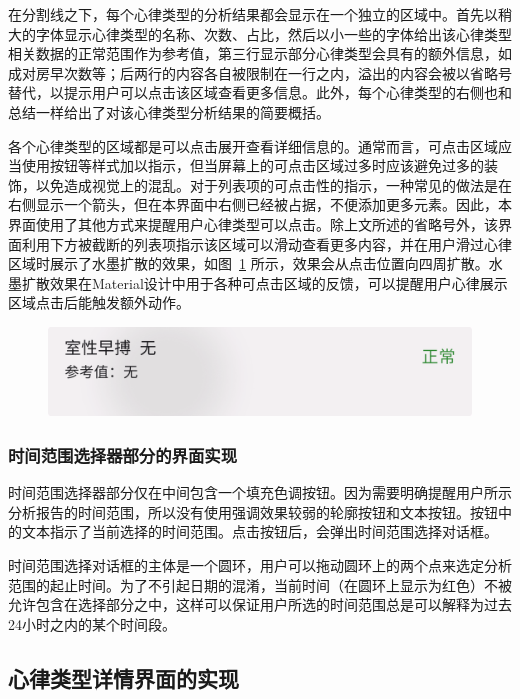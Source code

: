在分割线之下，每个心律类型的分析结果都会显示在一个独立的区域中。首先以稍大的字体显示心律类型的名称、次数、占比，然后以小一些的字体给出该心律类型相关数据的正常范围作为参考值，第三行显示部分心律类型会具有的额外信息，如成对房早次数等；后两行的内容各自被限制在一行之内，溢出的内容会被以省略号替代，以提示用户可以点击该区域查看更多信息。此外，每个心律类型的右侧也和总结一样给出了对该心律类型分析结果的简要概括。

各个心律类型的区域都是可以点击展开查看详细信息的。通常而言，可点击区域应当使用按钮等样式加以指示，但当屏幕上的可点击区域过多时应该避免过多的装饰，以免造成视觉上的混乱。对于列表项的可点击性的指示，一种常见的做法是在右侧显示一个箭头，但在本界面中右侧已经被占据，不便添加更多元素。因此，本界面使用了其他方式来提醒用户心律类型可以点击。除上文所述的省略号外，该界面利用下方被截断的列表项指示该区域可以滑动查看更多内容，并在用户滑过心律区域时展示了水墨扩散的效果，如图~\ref{fig:ink} 所示，效果会从点击位置向四周扩散。水墨扩散效果在Material设计中用于各种可点击区域的反馈，可以提醒用户心律展示区域点击后能触发额外动作。

\begin{figure}[ht]
    \centering
    \includegraphics[width=.5\textwidth]{../assets/ink}
    \label{fig:ink}
\end{figure}

\subsubsection{时间范围选择器部分的界面实现}\label{subsubsec:analytics-time-range-ui}

时间范围选择器部分仅在中间包含一个填充色调按钮。因为需要明确提醒用户所示分析报告的时间范围，所以没有使用强调效果较弱的轮廓按钮和文本按钮。按钮中的文本指示了当前选择的时间范围。点击按钮后，会弹出时间范围选择对话框。

时间范围选择对话框的主体是一个圆环，用户可以拖动圆环上的两个点来选定分析范围的起止时间。为了不引起日期的混淆，当前时间（在圆环上显示为红色）不被允许包含在选择部分之中，这样可以保证用户所选的时间范围总是可以解释为过去24小时之内的某个时间段。

\subsection{心律类型详情界面的实现}\label{subsec:label-details}

